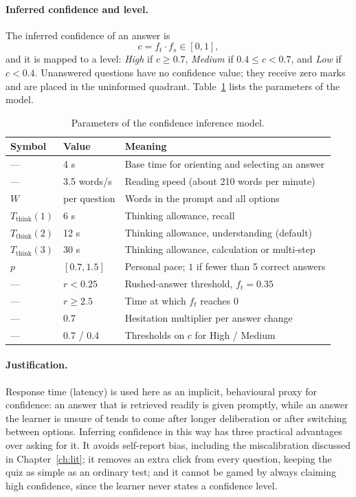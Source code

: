 \documentclass[12pt,a4paper,oneside]{report}
\begin{document}
\paragraph{Inferred confidence and level.} The inferred confidence of an
answer is
\begin{equation}
  c = f_t \cdot f_s \in [0, 1],
  \label{eq:confidence}
\end{equation}
and it is mapped to a level: \emph{High} if $c \ge 0.7$, \emph{Medium} if
$0.4 \le c < 0.7$, and \emph{Low} if $c < 0.4$. Unanswered questions have
no confidence value; they receive zero marks and are placed in the
uninformed quadrant. Table~\ref{tab:params} lists the parameters of the
model.

\begin{table}[H]
\centering
\caption{Parameters of the confidence inference model.}
\label{tab:params}
\begin{tabularx}{\textwidth}{@{}llX@{}}
\toprule
\textbf{Symbol} & \textbf{Value} & \textbf{Meaning} \\
\midrule
--- & 4 s & Base time for orienting and selecting an answer \\
--- & 3.5 words/s & Reading speed (about 210 words per minute) \\
$W$ & per question & Words in the prompt and all options \\
$T_{\mathrm{think}}(1)$ & 6 s & Thinking allowance, recall \\
$T_{\mathrm{think}}(2)$ & 12 s & Thinking allowance, understanding (default) \\
$T_{\mathrm{think}}(3)$ & 30 s & Thinking allowance, calculation or multi-step \\
$p$ & $[0.7, 1.5]$ & Personal pace; $1$ if fewer than 5 correct answers \\
--- & $r < 0.25$ & Rushed-answer threshold, $f_t = 0.35$ \\
--- & $r \ge 2.5$ & Time at which $f_t$ reaches 0 \\
--- & 0.7 & Hesitation multiplier per answer change \\
--- & 0.7 / 0.4 & Thresholds on $c$ for High / Medium \\
\bottomrule
\end{tabularx}
\end{table}

\paragraph{Justification.} Response time (latency) is used here as an
implicit, behavioural proxy for confidence: an answer that is retrieved
readily is given promptly, while an answer the learner is unsure of tends
to come after longer deliberation or after switching between options.
Inferring confidence in this way has three practical advantages over
asking for it. It avoids self-report bias, including the miscalibration
discussed in Chapter~\ref{ch:lit}; it removes an extra click from every
question, keeping the quiz as simple as an ordinary test; and it cannot be
gamed by always claiming high confidence, since the learner never states
a confidence level.
\end{document}
